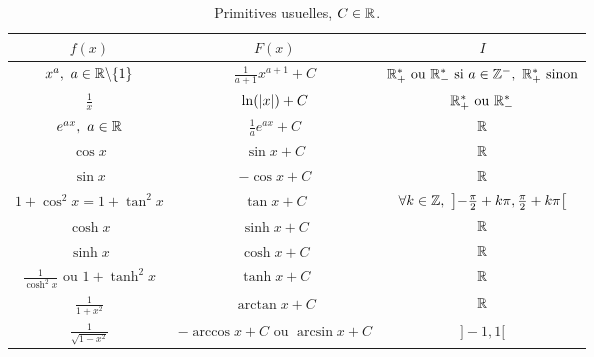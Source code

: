 \begin{table}[!h]
    \centering
    \begin{tabular}{ccc}
         \toprule
         $f(x)$ & $F(x)$ & $I$ \\
         \midrule
         $x^a,\ a \in \mathbb{R} \backslash \{1\}$ & $\frac{1}{a + 1} x^{a+1} + C$ & $\mathbb{R}_+^* \text{ ou } \mathbb{R}_-^* \text{ si } a \in \mathbb{Z}^-,\ \mathbb{R}_+^* \text{ sinon}$ \\
         $\frac{1}{x}$ & $\ln(\abs{x}) + C$ & $\mathbb{R}_+^* \text{ ou } \mathbb{R}_-^*$ \\
         $e^{ax},\ a \in \mathbb{R}$ & $\frac{1}{a} e^{ax} + C$ & $\mathbb{R}$ \\
         $\cos{x}$ & $\sin{x} + C$ & $\mathbb{R}$ \\
         $\sin{x}$ & $-\cos{x} + C$ & $\mathbb{R}$ \\
         $1 + \cos^2{x} = 1 + \tan^2{x}$ & $\tan{x} + C$ & $\forall k \in \mathbb{Z},\ \left] -\frac{\pi}{2} + k \pi, \frac{\pi}{2} + k \pi \right[$ \\
         $\cosh{x}$ & $\sinh{x} + C$ & $\mathbb{R}$ \\
         $\sinh{x}$ & $\cosh{x} + C$ & $\mathbb{R}$ \\
         $\frac{1}{\cosh^2{x}} \text{ ou } 1 + \tanh^2{x}$ & $\tanh{x} + C$ & $\mathbb{R}$ \\
         $\frac{1}{1 + x^2}$ & $\arctan{x} + C$ & $\mathbb{R}$ \\
         $\frac{1}{\sqrt{1 - x^2}}$ & $-\arccos{x} + C \text{ ou } \arcsin{x} + C$ & $]-1, 1[$ \\
         \bottomrule
    \end{tabular}
    \caption{Primitives usuelles, $C \in \mathbb{R}$.}
    \label{tab:primitives_usuelles}
\end{table}

